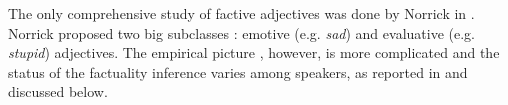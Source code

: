 \documentclass[10pt]{article}
\begin{document}

The only comprehensive study of factive adjectives was done by Norrick in \cite{norrick:1978}. Norrick proposed two big subclasses : emotive (e.g. \textit{sad}) and evaluative (e.g. \textit{stupid}) adjectives. The empirical picture , however, is more complicated and the status of the factuality inference varies among speakers, as reported in \cite{csli-gang-cssp13} and discussed below.



\end{document}

